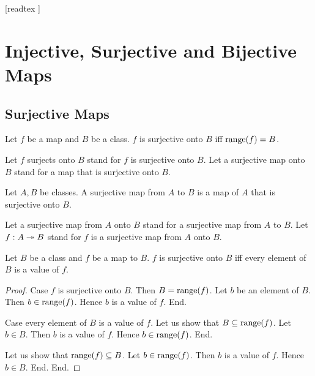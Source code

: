 \documentclass[10pt]{article}
\begin{document}
  \begin{imports}
    \begin{forthel}
      [readtex ]
    \end{forthel}
  \end{imports}


  \section*{Injective, Surjective and Bijective Maps}

  \subsection*{Surjective Maps}

  \begin{forthel}
    \begin{definition}
      Let $f$ be a map and $B$ be a class.
      $f$ is surjective onto $B$ iff $\textrm{range}(f) = B$.
    \end{definition}

    Let $f$ surjects onto $B$ stand for $f$ is surjective onto $B$.
    Let a surjective map onto $B$ stand for a map that is surjective onto $B$.
  \end{forthel}

  \begin{forthel}
    \begin{definition}
      Let $A, B$ be classes.
      A surjective map from $A$ to $B$ is a map of $A$ that is surjective onto $B$.
    \end{definition}

    Let a surjective map from $A$ onto $B$ stand for a surjective map from $A$ to $B$.
    Let $f: A \twoheadrightarrow B$ stand for $f$ is a surjective map from $A$ onto $B$.
  \end{forthel}

  \begin{forthel}
    \begin{proposition}
      Let $B$ be a class and $f$ be a map to $B$.
      $f$ is surjective onto $B$ iff every element of $B$ is a value of $f$.
    \end{proposition}
    \begin{proof}
      Case $f$ is surjective onto $B$.
        Then $B = \textrm{range}(f)$.
        Let $b$ be an element of $B$.
        Then $b \in \textrm{range}(f)$.
        Hence $b$ is a value of $f$.
      End.

      Case every element of $B$ is a value of $f$.
        Let us show that $B \subseteq \textrm{range}(f)$.
          Let $b \in B$.
          Then $b$ is a value of $f$.
          Hence $b \in \textrm{range}(f)$.
        End.

        Let us show that $\textrm{range}(f) \subseteq B$.
          Let $b \in \textrm{range}(f)$.
          Then $b$ is a value of $f$.
          Hence $b \in B$.
        End.
      End.
    \end{proof}
  \end{forthel}
\end{document}
